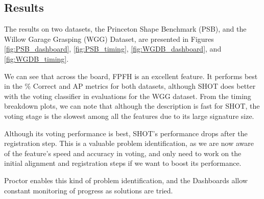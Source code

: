 \subsection{Results}
The results on two datasets, the Princeton Shape Benchmark (PSB), and the Willow Garage Grasping (WGG) Dataset, are presented in Figures \ref{fig:PSB_dashboard}, \ref{fig:PSB_timing}, \ref{fig:WGDB_dashboard}, and \ref{fig:WGDB_timing}.

We can see that across the board, FPFH is an excellent feature.
It performs best in the \% Correct and AP metrics for both datasets, although SHOT does better with the voting classifier in evaluations for the WGG dataset.
From the timing breakdown plots, we can note that although the description is fast for SHOT, the voting stage is the slowest among all the features due to its large signature size.

Although its voting performance is best, SHOT's performance drops after the registration step.
This is a valuable problem identification, as we are now aware of the feature's speed and accuracy in voting, and only need to work on the initial alignment and registration steps if we want to boost its performance.

Proctor enables this kind of problem identification, and the Dashboards allow constant monitoring of progress as solutions are tried.
